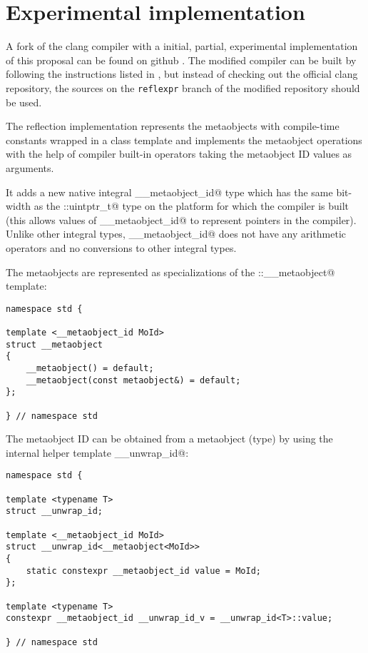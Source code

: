 \section{Experimental implementation}

A fork of the clang compiler with a initial, partial, experimental implementation
of this proposal can be found on github \cite{ReflexprImplementation}.
The modified compiler can be built by following the instructions listed
in \cite{ClangGettingStarted}, but instead of checking out the official clang
repository, the sources on the \texttt{reflexpr} branch of the modified
repository should be used.

The reflection implementation represents the metaobjects with compile-time
constants wrapped in a class template and implements the metaobject operations
with the help of compiler built-in operators taking the metaobject ID values
as arguments. 

It adds a new native integral \verb@__metaobject_id@ type which has the same
bit-width as the \verb@std::uintptr_t@ type on the platform for which
the compiler is built (this allows values of \verb@__metaobject_id@ to represent
pointers in the compiler). Unlike other integral types, \verb@__metaobject_id@
does not have any arithmetic operators and no conversions to other integral types. 

The metaobjects are represented as specializations of the \verb@std::__metaobject@
template: 

\begin{verbatim}
namespace std {

template <__metaobject_id MoId>
struct __metaobject
{
	__metaobject() = default;
	__metaobject(const metaobject&) = default;
};

} // namespace std
\end{verbatim}

The metaobject ID can be obtained from a metaobject (type) by using the internal
helper template \verb@__unwrap_id@: 

\begin{verbatim}
namespace std {

template <typename T>
struct __unwrap_id;

template <__metaobject_id MoId>
struct __unwrap_id<__metaobject<MoId>>
{
	static constexpr __metaobject_id value = MoId;
};

template <typename T>
constexpr __metaobject_id __unwrap_id_v = __unwrap_id<T>::value;

} // namespace std
\end{verbatim}

